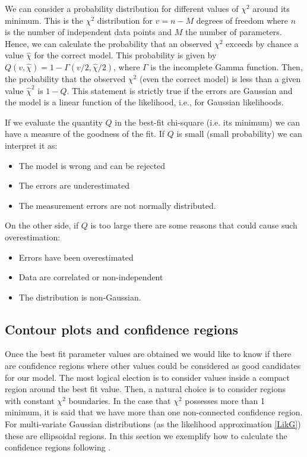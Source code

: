 \documentclass[onecolumn,           %
               showpacs,            %
               preprintnumbers,     %
               aps,                 %
               prl,          	    %
               letterpaper,             %
               superscriptaddress,      %
               nofootinbib,         %
               tightenlines,        %
               floats,floatfix      %
               ,usenatbib,
               ]{revtex4-1}
\begin{document}
We can consider a probability distribution for different values of $\chi^2$ around its minimum. This is the $\chi^2$ distribution for $v=n-M$ degrees of freedom where $n$ is the number of independent data points and $M$ the number of parameters. Hence, we can calculate the probability that an observed $\chi^2$ exceeds by chance a value $\hat \chi$ for the correct model. This probability is given by \cite{NR} $Q(v,\hat\chi)=1-\Gamma(v/2,\hat\chi/2)$, where $\Gamma$ is the incomplete Gamma function. Then, the probability that the observed $\chi^2$ (even the correct model) is less than a given value $\hat\chi^2$ is $1-Q$. This statement is strictly true if the errors are Gaussian and the model is a linear function of the likelihood, i.e., for Gaussian likelihoods.

If we evaluate the quantity $Q$ in the best-fit chi-square (i.e. its minimum) we can have a measure of the goodness of the fit. If $Q$ is small (small probability) we can interpret it as:
\begin{itemize}
\item The model is wrong and can be rejected
\item The errors are underestimated 
\item The measurement errors are not normally distributed.
\end{itemize}
On the other side, if $Q$ is too large there are some reasons that could cause such overestimation:
\begin{itemize}
\item Errors have been overestimated
\item Data are correlated or non-independent
\item The distribution is non-Gaussian.
\end{itemize}
\subsection{Contour plots and confidence regions}

Once the best fit parameter values are obtained we would like to know if there are confidence regions where other values could be considered as good candidates for our model. The most logical election is to consider values inside a compact region around the best fit value. Then, a natural choice is to consider regions with constant $\chi^2$ boundaries. In the case that $\chi^2$ possesses more than 1 minimum, it is said that we have more than one non-connected confidence region. For multi-variate Gaussian distributions (as the likelihood approximation \eqref{LikG}) these are ellipsoidal regions. In this section we exemplify how to calculate the confidence regions following \cite{LiV}. 
\end{document}
